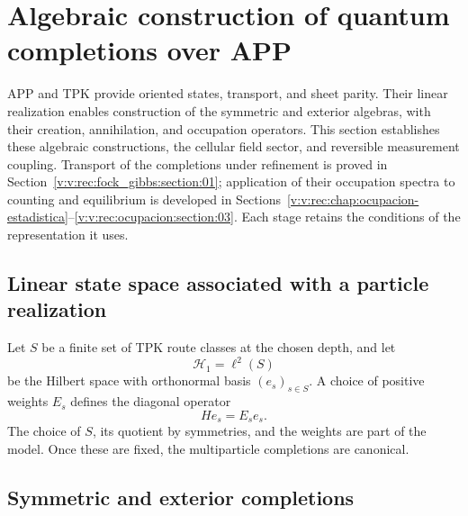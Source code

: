 \section{Algebraic construction of quantum completions over APP}
\label{v:v:rec:chap:completaciones-cuanticas}
\label{v:v:sec:completaciones-algebraicas}

APP and TPK provide oriented states, transport, and sheet parity.
Their linear realization enables construction of the symmetric and exterior algebras,
with their creation, annihilation, and occupation operators. This section
establishes these algebraic constructions, the cellular field sector, and
reversible measurement coupling. Transport of the completions
under refinement is proved in
Section~\ref{v:v:rec:fock_gibbs:section:01}; application of their occupation
spectra to counting and equilibrium is developed in
Sections~\ref{v:v:rec:chap:ocupacion-estadistica}--\ref{v:v:rec:ocupacion:section:03}.
Each stage retains the conditions of the representation it uses.

\subsection{Linear state space associated with a particle realization}
\label{v:v:rec:completaciones:section:02}

Let \(S\) be a finite set of TPK route classes at the chosen depth,
and let
\[
 \mathcal H_1=\ell^2(S)
\]
be the Hilbert space with orthonormal basis \((e_s)_{s\in S}\). A choice of
positive weights \(E_s\) defines the diagonal operator
\[
 He_s=E_se_s.
\]
The choice of \(S\), its quotient by symmetries, and the weights are part
of the model. Once these are fixed, the multiparticle completions are canonical.

\subsection{Symmetric and exterior completions}
\label{v:v:rec:completaciones:section:03}

